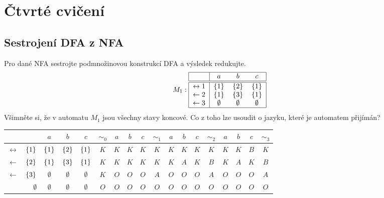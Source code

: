 \section{Čtvrté cvičení}

\subsection{Sestrojení DFA z NFA}
Pro dané NFA sestrojte podmnožinovou konstrukcí DFA a výsledek redukujte.
\[
M_1:
\begin{tabular}{|r|c c c|}
    \hline
    & $a$ & $b$ & $c$\\
    \hline
    \hline
    $\leftrightarrow 1$& $\bc{1}$ & $\bc{2}$& $\bc{1}$\\
    $\leftarrow2$      & $\bc{1}$ & $\bc{3}$& $\bc{1}$\\
    $\leftarrow3$      & $\emptyset$ & $\emptyset$& $\emptyset$\\
    \hline
\end{tabular}
\]
Všimněte si, že v automatu $M_1$ jsou všechny stavy koncové. Co z toho lze usoudit o jazyku, které je automatem přijímán?
\begin{center}
    \begin{tabular}{|r r|c c c||c|c c c||c|c c c||c|c c c||c|}
        \hline
        & $ $ & $ a $ & $ b $ & $ c $ & $ \sim_0 $ & $ a $ & $ b $ & $ c $ & $ \sim_1 $ & $ a $ & $ b $ & $ c $ & $ \sim_2 $ & $ a $ & $ b $ & $ c $ & $ \sim_3 $ \\ \hline \hline
        $\leftrightarrow$& $\left\lbrace 1 \right\rbrace  $ & $ \left\lbrace 1 \right\rbrace    $ & $ \left\lbrace 2 \right\rbrace    $ & $ \left\lbrace 1 \right\rbrace    $ & $ K $ & $ K $ & $ K $ & $ K $ & $ K $ & $ K $ & $ K $ & $ K $ & $ K $ & $ K $ & $ K $ & $ B $ & $ K $ \\
        $\leftarrow$     & $\left\lbrace 2 \right\rbrace  $ & $ \left\lbrace 1 \right\rbrace    $ & $ \left\lbrace 3 \right\rbrace    $ & $ \left\lbrace 1 \right\rbrace    $ & $ K $ & $ K $ & $ K $ & $ K $ & $ K $ & $ K $ & $ A $ & $ K $ & $ B $ & $ K $ & $ A $ & $ K $ & $ B $ \\
        $\leftarrow$     & $\left\lbrace 3 \right\rbrace  $ & $ \emptyset $ & $ \emptyset $ & $ \emptyset $ & $ K $ & $ O $ & $ O $ & $ O $ & $ A $ & $ O $ & $ O $ & $ O $ & $ A $ & $ O $ & $ O $ & $ O $ & $ A $ \\
                         & $\emptyset$& $ \emptyset $ & $ \emptyset $ & $ \emptyset $ & $ O $ & $ O $ & $ O $ & $ O $ & $ O $ & $ O $ & $ O $ & $ O $ & $ O $ & $ O $ & $ O $ & $ O $ & $ O $ \\
        \hline
\end{tabular}\\
\end{center}

